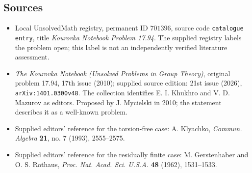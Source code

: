 \documentclass[11pt]{article}
\begin{document}
\subsection{Sources}
\begin{itemize}
\item Local UnsolvedMath registry, permanent ID \(701396\), source code \texttt{catalogue entry}, title \emph{Kourovka Notebook Problem 17.94}. The supplied registry labels the problem open; this label is not an independently verified literature assessment.
\item \emph{The Kourovka Notebook (Unsolved Problems in Group Theory)}, original problem 17.94, 17th issue (2010); supplied source edition: 21st issue (2026), \texttt{arXiv:1401.0300v48}. The collection identifies E. I. Khukhro and V. D. Mazurov as editors. Proposed by J. Mycielski in 2010; the statement describes it as a well-known problem.
\item Supplied editors' reference for the torsion-free case: A. Klyachko, \emph{Commun. Algebra} \textbf{21}, no. 7 (1993), 2555--2575.
\item Supplied editors' reference for the residually finite case: M. Gerstenhaber and O. S. Rothaus, \emph{Proc. Nat. Acad. Sci. U.S.A.} \textbf{48} (1962), 1531--1533.
\end{itemize}
\end{document}
